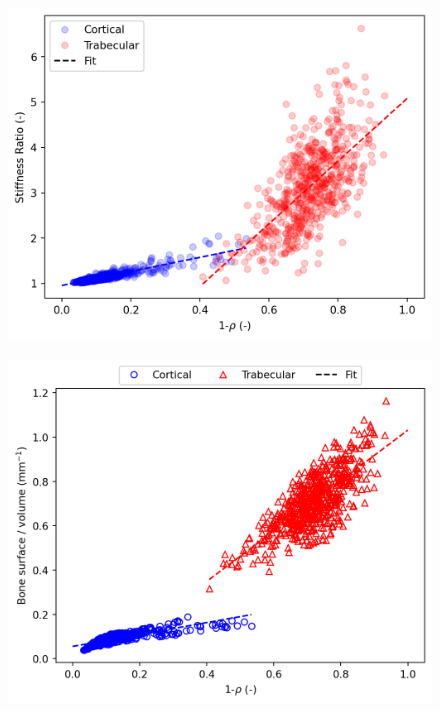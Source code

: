 \documentclass[a4paper,fleqn]{DC_ArtStyle}
\begin{document}
	\begin{figure}
		\includegraphics[width=\linewidth]{StiffnessRatio}
	\end{figure}

	\begin{figure}
		\includegraphics[width=\linewidth]{SVRatio}
	\end{figure}
\end{document}
